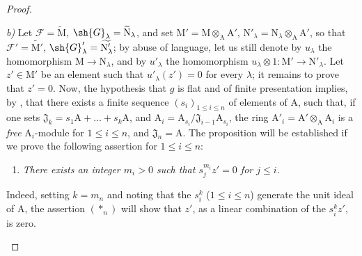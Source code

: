 \begin{proof}
\begin{enumerate}[label=(\roman*)]
  \emph{b)} Let $\mathscr{F}=\widetilde{\mathrm{M}}$, $\sh{G}_\lambda=\widetilde{\mathrm{N}}_\lambda$, and set $\mathrm{M}'=\mathrm{M}\otimes_\mathrm{A}\mathrm{A}'$, $\mathrm{N}'_\lambda=\mathrm{N}_\lambda\otimes_\mathrm{A}\mathrm{A}'$, so that $\mathscr{F}'=\widetilde{\mathrm{M}'}$, $\sh{G}'_\lambda=\widetilde{\mathrm{N}'_\lambda}$; by abuse of language, let us still denote by $u_\lambda$ the homomorphism $\mathrm{M}\to\mathrm{N}_\lambda$, and by $u'_\lambda$ the homomorphism $u_\lambda\otimes 1:\mathrm{M}'\to\mathrm{N}'_\lambda$.
  Let $z'\in\mathrm{M}'$ be an element such that $u'_\lambda(z')=0$ for every $\lambda$; it remains to prove that $z'=0$.
  Now, the hypothesis that $g$ is flat and of finite presentation implies, by , that there exists a finite sequence $(s_i)_{1\leq i\leq n}$ of elements of $\mathrm{A}$, such that, if one sets $\mathfrak{J}_k=s_1\mathrm{A}+\ldots+s_k\mathrm{A}$, and $\mathrm{A}_i=\mathrm{A}_{s_i}/\mathfrak{J}_{i-1}\mathrm{A}_{s_i}$, the ring $\mathrm{A}'_i=\mathrm{A}'\otimes_\mathrm{A}\mathrm{A}_i$ is a \emph{free} $\mathrm{A}_i$-module for $1\leq i\leq n$, and $\mathfrak{J}_n=\mathrm{A}$.
  The proposition will be established if we prove the following assertion for $1\leq i\leq n$:
  \begin{enumerate}[label=$(*_i)$]
    \item \emph{There exists an integer $m_i>0$ such that $s_j^{m_i}z'=0$ for $j\leq i$.}
  \end{enumerate}
  Indeed, setting $k=m_n$ and noting that the $s_i^k$ ($1\leq i\leq n$) generate the unit ideal of $\mathrm{A}$, the assertion $(*_n)$ will show that $z'$, as a linear combination of the $s_i^k z'$, is zero.


\end{enumerate}
\end{proof}

